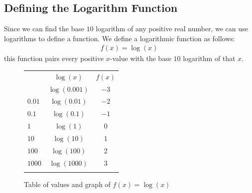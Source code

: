 \documentclass[10pt,]{book}
\theoremstyle{ptxdefinitionnotitle}
\theoremstyle{ptxdefinitiontitle}
\theoremstyle{ptxdefinitionnotitle}
\theoremstyle{ptxdefinitiontitle}
\theoremstyle{ptxdefinitionnotitle}
\theoremstyle{ptxdefinitiontitle}
\numberwithin{equation}{section}
\newcommand{\hrulemedium}{\noalign{\hrule height 0.07em}}
\newcommand{\hrulethick} {\noalign{\hrule height 0.11em}}
\begin{document}
\subsection[{Defining the Logarithm Function}]{Defining the Logarithm Function}\label{subsection-2}
\hypertarget{p-323}{}%
Since we can find the base \(10\) logarithm of any positive real number, we can use logarithms to define a function.  We define a logarithmic function as follows:%
\begin{gather*}
f(x) = \log(x)
\end{gather*}
this function pairs every positive \(x\)-value with the base \(10\) logarithm of that \(x\).%
\begin{figure}
\centering
\begin{sidebyside}{2}{0}{0}{0}
\begin{sbspanel}{0.5}
{\centering%
\begin{tabular}{ccc}\hrulethick
\multicolumn{1}{l}{\(x\)}&\(\log(x)\)&\(f(x)\)\tabularnewline\hrulemedium
\multicolumn{1}{l}{\(0.001\)}&\(\log(0.001)\)&\(-3\)\tabularnewline[0pt]
\multicolumn{1}{l}{\(0.01\)}&\(\log(0.01)\)&\(-2\)\tabularnewline[0pt]
\multicolumn{1}{l}{\(0.1\)}&\(\log(0.1)\)&\(-1\)\tabularnewline[0pt]
\multicolumn{1}{l}{\(1\)}&\(\log(1)\)&\(0\)\tabularnewline[0pt]
\multicolumn{1}{l}{\(10\)}&\(\log(10)\)&\(1\)\tabularnewline[0pt]
\multicolumn{1}{l}{\(100\)}&\(\log(100)\)&\(2\)\tabularnewline[0pt]
\multicolumn{1}{l}{\(1000\)}&\(\log(1000)\)&\(3\)\tabularnewline\hrulethick
\end{tabular}
\par}
\end{sbspanel}
\begin{sbspanel}{0.5}
\end{sbspanel}
\end{sidebyside}
\caption{Table of values and graph of \(f(x) = \log(x)\)\label{figure-21}}
\end{figure}
\end{document}
